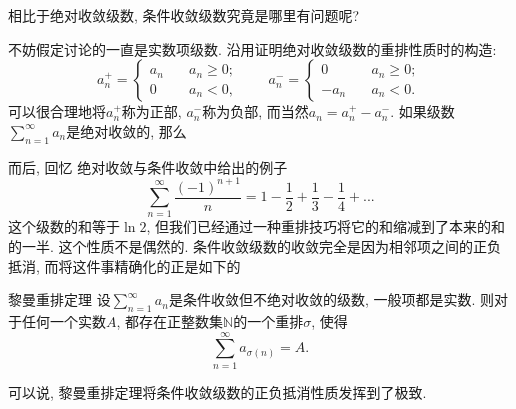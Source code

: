 

相比于绝对收敛级数, 条件收敛级数究竟是哪里有问题呢? 

不妨假定讨论的一直是实数项级数. 沿用证明绝对收敛级数的重排性质时的构造: 
$$
a_n^+=\left\{\begin{array}{cc}
{a_n}\quad &a_n\geq0;\\
0\quad &a_n<0,
\end{array}\right.
\quad\quad
a_n^-=\left\{\begin{array}{cc}
0\quad &a_n\geq0;\\
-a_n\quad &a_n<0.
\end{array}\right.
$$
可以很合理地将$a_n^+$称为正部, $a_n^-$称为负部, 而当然$a_n=a_n^+-a_n^-$. 如果级数$\sum_{n=1}^\infty a_n$是绝对收敛的, 那么

而后, 回忆 绝对收敛与条件收敛中给出的例子
$$
\sum_{n=1}^\infty\frac{(-1)^{n+1}}{n}
=1-\frac{1}{2}+\frac{1}{3}-\frac{1}{4}+...
$$
这个级数的和等于$\ln2$, 但我们已经通过一种重排技巧将它的和缩减到了本来的和的一半. 这个性质不是偶然的. 条件收敛级数的收敛完全是因为相邻项之间的正负抵消, 而将这件事精确化的正是如下的

\begin{theorem}{黎曼重排定理}
设$\sum_{n=1}^\infty a_n$是条件收敛但不绝对收敛的级数, 一般项都是实数. 则对于任何一个实数$A$, 都存在正整数集$\mathbb{N}$的一个重排$\sigma$, 使得
$$
\sum_{n=1}^\infty a_{\sigma(n)}=A.
$$
\end{theorem}

可以说, 黎曼重排定理将条件收敛级数的正负抵消性质发挥到了极致.